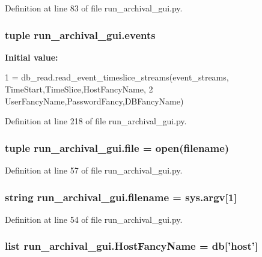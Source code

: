 Definition at line 83 of file run\-\_\-archival\-\_\-gui.\-py.

\hypertarget{namespacerun__archival__gui_a2b12ba57b71812997e5dd0f627c6b7fe}{
\subsubsection[{events}]{\setlength{\rightskip}{0pt plus 5cm}tuple run\-\_\-archival\-\_\-gui.\-events}}\label{namespacerun__archival__gui_a2b12ba57b71812997e5dd0f627c6b7fe}
{\bfseries Initial value\-:}
\begin{DoxyCode}
1 = db\_read.read\_event\_timeslice\_streams(event\_streams, TimeStart,TimeSlice,HostFancyName,
2                                     UserFancyName,PasswordFancy,DBFancyName)
\end{DoxyCode}


Definition at line 218 of file run\-\_\-archival\-\_\-gui.\-py.

\hypertarget{namespacerun__archival__gui_a9a26e2184288cff2d81e765003fe7897}{
\subsubsection[{file}]{\setlength{\rightskip}{0pt plus 5cm}tuple run\-\_\-archival\-\_\-gui.\-file = open({\bf filename})}}\label{namespacerun__archival__gui_a9a26e2184288cff2d81e765003fe7897}


Definition at line 57 of file run\-\_\-archival\-\_\-gui.\-py.

\hypertarget{namespacerun__archival__gui_a152f939cb3f2e943a37737fb505c7b7e}{
\subsubsection[{filename}]{\setlength{\rightskip}{0pt plus 5cm}string run\-\_\-archival\-\_\-gui.\-filename = sys.\-argv\mbox{[}1\mbox{]}}}\label{namespacerun__archival__gui_a152f939cb3f2e943a37737fb505c7b7e}


Definition at line 54 of file run\-\_\-archival\-\_\-gui.\-py.

\hypertarget{namespacerun__archival__gui_a300818b5e7911daac7a5ffc565ef38bb}{
\subsubsection[{Host\-Fancy\-Name}]{\setlength{\rightskip}{0pt plus 5cm}list run\-\_\-archival\-\_\-gui.\-Host\-Fancy\-Name = {\bf db}\mbox{[}'host'\mbox{]}}}\label{namespacerun__archival__gui_a300818b5e7911daac7a5ffc565ef38bb}


